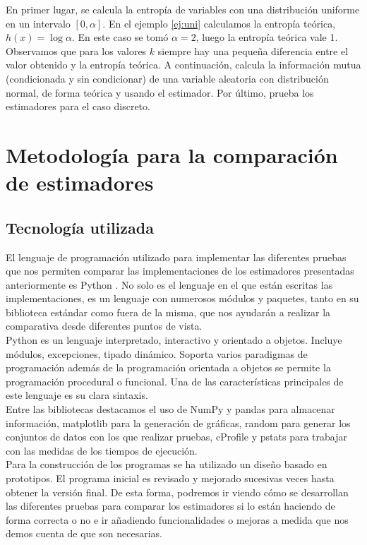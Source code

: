 \documentclass[12pt,a4paper]{report} %
\theoremstyle{definition}
\begin{document}
En primer lugar, se calcula la entropía de variables con una distribución uniforme en un intervalo $[0,\alpha]$. En el ejemplo \ref{ej:uni} calculamos la entropía teórica, $h(x) = \log \alpha$. En este caso se tomó $\alpha = 2$, luego la entropía teórica vale 1. Observamos que para los valores $k$ siempre hay una pequeña diferencia entre el valor obtenido y la entropía teórica. A continuación, calcula la información mutua (condicionada y sin condicionar) de una variable aleatoria con distribución normal, de forma teórica y usando el estimador. Por último, prueba los estimadores para el caso discreto. 


\chapter{Metodología para la comparación de estimadores}
\section{Tecnología utilizada}

El lenguaje de programación utilizado para implementar las diferentes pruebas que nos permiten comparar las implementaciones de los estimadores presentadas anteriormente es Python \cite{python}. No solo es el lenguaje en el que están escritas las implementaciones, es un lenguaje con numerosos módulos y paquetes, tanto en su biblioteca estándar como fuera de la misma, que nos ayudarán a realizar la comparativa desde diferentes puntos de vista.\\

Python es un lenguaje interpretado, interactivo y orientado a objetos. Incluye módulos, excepciones, tipado dinámico. Soporta varios paradigmas de programación además de la programación orientada a objetos se permite la programación procedural o funcional. Una de las características principales de este lenguaje es su clara sintaxis.\\

Entre las bibliotecas destacamos el uso de NumPy \cite{numpy} y pandas \cite{pandas} para almacenar información, matplotlib \cite{matplotlib} para la generación de gráficas, random \cite{random} para generar los conjuntos de datos con los que realizar pruebas, cProfile y pstats \cite{profilers} para trabajar con las medidas de los tiempos de ejecución.\\

Para la construcción de los programas se ha utilizado un diseño basado en prototipos. El programa inicial es revisado y mejorado sucesivas veces hasta obtener la versión final. De esta forma, podremos ir viendo cómo se desarrollan las diferentes pruebas para comparar los estimadores si lo están haciendo de forma correcta o no e ir añadiendo funcionalidades o mejoras a medida que nos demos cuenta de que son necesarias.\\
\end{document}

